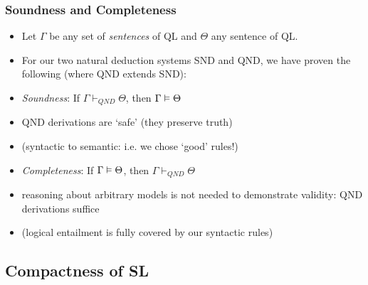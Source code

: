 \begin{frame}
\frametitle{Soundness and Completeness}

\begin{itemize}[<+->]

\item Let $\Gamma$ be any set of \textit{sentences} of QL and $\Theta$ any sentence of QL. 

\item For our two natural deduction systems SND and QND, we have proven the following (where QND extends SND):

\medskip 

\item \emph{Soundness}: If $\Gamma \vdash_{QND} \Theta$, then $\Gamma \vDash \Theta$

\bi 

\item QND derivations are `safe' (they preserve truth)

\item (syntactic to semantic: i.e. we chose `good' rules!)

\ei

\bigskip 

\item \emph{Completeness}: If $\Gamma \vDash \Theta$, then $\Gamma \vdash_{QND} \Theta$


\medskip 

\bi

\item reasoning about arbitrary models is not needed to demonstrate validity: QND derivations suffice

\item (logical entailment is fully covered by our syntactic rules)


\ei

\end{itemize}
\end{frame}

\subsection{Compactness of SL}

